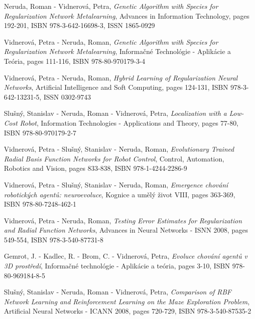 \vspace{0.4em}
\noindent
Neruda, Roman - Vidnerová, Petra, {\em Genetic Algorithm with Species for Regularization Network Metalearning}, Advances in Information Technology, pages 192-201, ISBN 978-3-642-16698-3, ISSN 1865-0929

\vspace{0.4em}
\noindent
Vidnerová, Petra - Neruda, Roman, {\em Genetic Algorithm with Species for Regularization Network Metalearning}, Informačné Technológie - Aplikácie a Teória, pages 111-116, ISBN 978-80-970179-3-4

\vspace{0.4em}
\noindent
Vidnerová, Petra - Neruda, Roman, {\em Hybrid Learning of Regularization Neural Networks}, Artificial Intelligence and Soft Computing, pages 124-131, ISBN 978-3-642-13231-5, ISSN 0302-9743

\vspace{0.4em}
\noindent
Slušný, Stanislav - Neruda, Roman - Vidnerová, Petra, {\em Localization with a Low-Cost Robot}, Information Technologies - Applications and Theory, pages 77-80, ISBN 978-80-970179-2-7

\vspace{0.4em}
\noindent
Vidnerová, Petra - Slušný, Stanislav - Neruda, Roman, {\em Evolutionary Trained Radial Basis Function Networks for Robot Control}, Control, Automation, Robotics and Vision, pages 833-838, ISBN 978-1-4244-2286-9

\vspace{0.4em}
\noindent
Vidnerová, Petra - Slušný, Stanislav - Neruda, Roman, {\em Emergence chování robotických agentů: neuroevoluce}, Kognice a umělý život VIII, pages 363-369, ISBN 978-80-7248-462-1

\vspace{0.4em}
\noindent
Vidnerová, Petra - Neruda, Roman, {\em Testing Error Estimates for Regularization and Radial Function Networks}, Advances in Neural Networks - ISNN 2008, pages 549-554, ISBN 978-3-540-87731-8

\vspace{0.4em}
\noindent
Gemrot, J. - Kadlec, R. - Brom, C. - Vidnerová, Petra, {\em Evoluce chování agentů v 3D prostředí}, Informačné technológie - Aplikácie a teória, pages 3-10, ISBN 978-80-969184-8-5

\vspace{0.4em}
\noindent
Slušný, Stanislav - Neruda, Roman - Vidnerová, Petra, {\em Comparison of RBF Network Learning and Reinforcement Learning on the Maze Exploration Problem}, Artificial Neural Networks - ICANN 2008, pages 720-729, ISBN 978-3-540-87535-2


